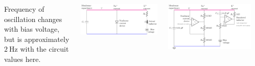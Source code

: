 \documentclass[25pt, a0paper, landscape, fleqn]{tikzposter}
\begin{document}
\begin{columns}
{  Frequency of oscillation changes with bias voltage, but is approximately $\SI{2}{\hertz}$ with the circuit values here.

  \begin{minipage}[b]{0.19\pagewidth}
    \begin{tikzfigure}
      \includegraphics[width=0.18\pagewidth]{./Figures/Nagumo/Nagumo.pdf}
    \end{tikzfigure}
    \begin{tikzfigure}
      \includegraphics[width=0.19\pagewidth]{./Figures/NeuronUnit/NeuronUnit.pdf}
    \end{tikzfigure}
  \end{minipage}
  \begin{minipage}[b]{0.1\pagewidth}
    \begin{tikzfigure}[Nullclines]
      \centering

\end{tikzfigure}
\end{minipage}}
\end{columns}
\end{document}

